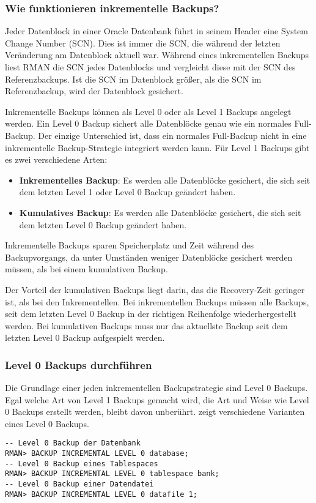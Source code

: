         \subsubsection{Wie funktionieren inkrementelle Backups?}
          Jeder Datenblock in einer Oracle Datenbank führt in seinem Header eine System Change Number (SCN). Dies ist immer die SCN, die während der letzten Veränderung am Datenblock aktuell war. Während eines inkrementellen Backups liest RMAN die SCN jedes Datenblocks und vergleicht diese mit der SCN des Referenzbackups. Ist die SCN im Datenblock größer, als die SCN im Referenzbackup, wird der Datenblock gesichert.

          Inkrementelle Backups können als Level 0 oder als Level 1 Backups angelegt werden. Ein Level 0 Backup sichert alle Datenblöcke genau wie ein normales Full-Backup. Der einzige Unterschied ist, dass ein normales Full-Backup nicht in eine inkrementelle Backup-Strategie integriert werden kann.
\clearpage
          Für Level 1 Backups gibt es zwei verschiedene Arten:
          \begin{itemize}
            \item \textbf{Inkrementelles Backup}: Es werden alle Datenblöcke gesichert, die sich seit dem letzten Level 1 oder Level 0 Backup geändert haben.
            \item \textbf{Kumulatives Backup}: Es werden alle Datenblöcke gesichert, die sich seit dem letzten Level 0 Backup geändert haben.
          \end{itemize}
           Inkrementelle Backups sparen Speicherplatz und Zeit während des Backupvorgangs, da unter Umständen weniger Datenblöcke gesichert werden müssen, als bei einem kumulativen Backup.

          Der Vorteil der kumulativen Backups liegt darin, das die Recovery-Zeit geringer ist, als bei den Inkrementellen. Bei inkrementellen Backups müssen alle Backups, seit dem letzten Level 0 Backup in der richtigen Reihenfolge wiederhergestellt werden. Bei kumulativen Backups muss nur das aktuellste Backup seit dem letzten Level 0 Backup aufgespielt werden.
        \subsubsection{Level 0 Backups durchführen}
          Die Grundlage einer jeden inkrementellen Backupstrategie sind Level 0 Backups. Egal welche Art von Level 1 Backups gemacht wird, die Art und Weise wie Level 0 Backups erstellt werden, bleibt davon unberührt.  zeigt verschiedene Varianten eines Level 0 Backups.
          \begin{lstlisting}[caption={Inkrementelles Level 0 Backup},label=admin1313,language=rman]
-- Level 0 Backup der Datenbank
RMAN> BACKUP INCREMENTAL LEVEL 0 database;
-- Level 0 Backup eines Tablespaces
RMAN> BACKUP INCREMENTAL LEVEL 0 tablespace bank;
-- Level 0 Backup einer Datendatei
RMAN> BACKUP INCREMENTAL LEVEL 0 datafile 1;
          \end{lstlisting}
